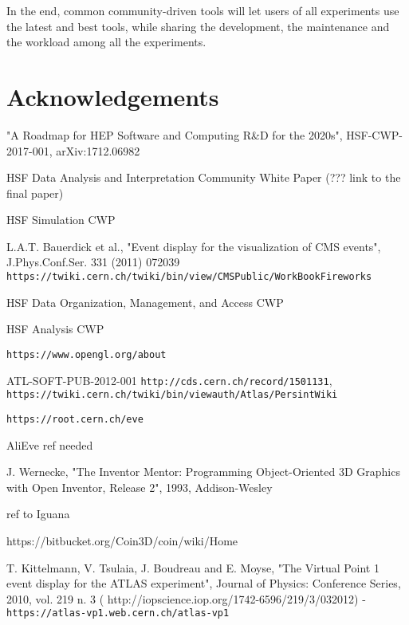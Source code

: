 \documentclass[12pt,a4paper]{article}
\begin{document}
In the end, common community-driven tools will let users of all experiments use the latest and best tools, while sharing the development,
the maintenance and the workload among all the experiments.

\hypertarget{acknowledgements}{%
\section{Acknowledgements}\label{acknowledgements}}

\begin{thebibliography}{999}

 "A Roadmap for HEP Software and Computing R\&D for the 2020s", HSF-CWP-2017-001, arXiv:1712.06982

 HSF Data Analysis and Interpretation Community White Paper (??? link to the final paper)

 HSF Simulation CWP

 L.A.T. Bauerdick et al., "Event display for the visualization of CMS events", J.Phys.Conf.Ser. 331 (2011) 072039
  {\tt https://twiki.cern.ch/twiki/bin/view/CMSPublic/WorkBookFireworks}

 HSF Data Organization, Management, and Access CWP

 HSF Analysis CWP

 {\tt https://www.opengl.org/about}

 ATL-SOFT-PUB-2012-001 {\tt http://cds.cern.ch/record/1501131},
{\tt https://twiki.cern.ch/twiki/bin/viewauth/Atlas/PersintWiki}

 {\tt https://root.cern.ch/eve}

 AliEve ref needed

 J. Wernecke, "The  Inventor Mentor: Programming Object-Oriented 3D Graphics with Open Inventor, Release 2", 1993, Addison-Wesley

 ref to Iguana

 https://bitbucket.org/Coin3D/coin/wiki/Home

 T. Kittelmann, V. Tsulaia, J. Boudreau and E. Moyse, "The Virtual Point 1 event display for the ATLAS experiment", Journal of Physics: Conference Series, 2010, vol. 219 n. 3 ( http://iopscience.iop.org/1742-6596/219/3/032012) -
{\tt https://atlas-vp1.web.cern.ch/atlas-vp1}


\end{thebibliography}
\end{document}
